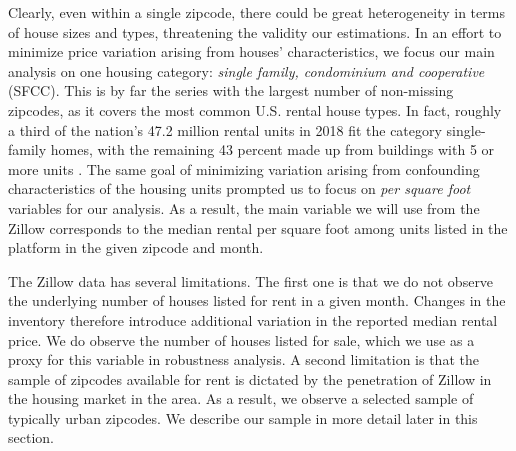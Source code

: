 Clearly, even within a single zipcode, there could be great heterogeneity in terms of 
house sizes and types, threatening the validity our estimations. In an effort to 
minimize price variation arising from houses' characteristics, we focus our main 
analysis on one housing category: \textit{single family, condominium and cooperative} 
(SFCC). This is by far the series with the largest number of non-missing zipcodes, as 
it covers the most common U.S. rental house types. In fact, roughly a third of the 
nation's 47.2 million rental units in 2018 fit the category single-family homes, with 
the remaining 43 percent made up from buildings with 5 or more units 
\parencite{fernald2020americas}. The same goal of minimizing variation arising from confounding
characteristics of the housing units prompted us to focus on \textit{per square foot} 
variables for our analysis. As a result, the main variable we will use from the Zillow
corresponds to the median rental per square foot among units listed in the platform
in the given zipcode and month.

The Zillow data has several limitations. The first one is that we do not observe the 
underlying number of houses listed for rent in a given month. Changes in the inventory 
therefore introduce additional variation in the reported median rental price. We do 
observe the number of houses listed for sale, which we use as a proxy for this variable 
in robustness analysis. A second limitation is that the sample of zipcodes available for 
rent is dictated by the penetration of Zillow in the housing market in the area. As a
result, we observe a selected sample of typically urban zipcodes. We describe our sample 
in more detail later in this section.


